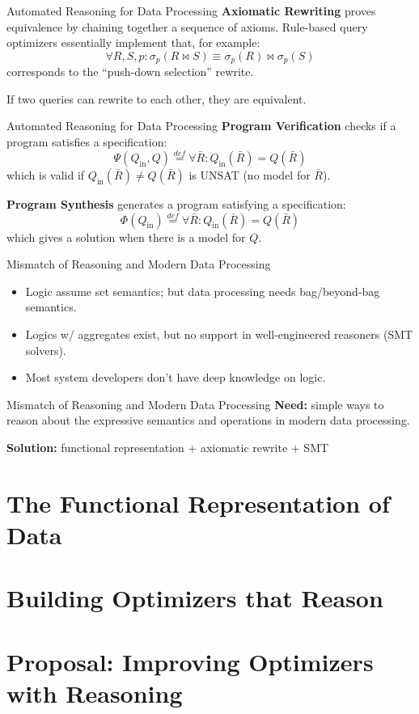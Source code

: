 \documentclass{beamer}
\begin{document}
  \begin{frame}{Automated Reasoning for Data Processing}
    \textbf{Axiomatic Rewriting} proves equivalence by chaining together 
    a sequence of axioms. \pause
    Rule-based query optimizers essentially implement that, for example:
    \[\forall R, S, p: \sigma_p (R\bowtie S) \equiv \sigma_p(R) \bowtie \sigma_p(S)\]
    corresponds to the ``push-down selection'' rewrite.\pause

    If two queries can rewrite to each other, they are equivalent.
  \end{frame}

  \begin{frame}{Automated Reasoning for Data Processing}
    \textbf{Program Verification} checks if a program satisfies a specification:
    \[\Psi(Q_{\text{in}}, Q) \stackrel{def}{=} \forall \bar R : Q_{\text{in}}(\bar R) = Q(\bar R)\]
    which is valid if $Q_{\text{in}}(\bar R) \neq Q(\bar R)$ is UNSAT (no model for $\bar R$). \pause

    \textbf{Program Synthesis} generates a program satisfying a specification:
    \[\Phi(Q_{\text{in}}) \stackrel{def}{=} \forall \bar R : Q_{\text{in}}(\bar R) = Q(\bar R)\]
    which gives a solution when there is a model for $Q$.
  \end{frame}

  \begin{frame}{Mismatch of Reasoning and Modern Data Processing}
    \begin{itemize}
      \item Logic assume set semantics; but data processing needs bag/beyond-bag semantics. \pause
      \item Logics w/ aggregates exist, but no support in well-engineered reasoners (SMT solvers). \pause
      \item Most system developers don't have deep knowledge on logic. 
    \end{itemize}    
  \end{frame}

  \begin{frame}{Mismatch of Reasoning and Modern Data Processing}
    \textbf{Need:} simple ways to reason about the expressive semantics and operations in modern 
    data processing. \pause

    \textbf{Solution:} functional representation + axiomatic rewrite + SMT
  \end{frame}

  \section{The Functional Representation of Data}
  \section{Building Optimizers that Reason}
  \section{Proposal: Improving Optimizers with Reasoning}
\end{document}
